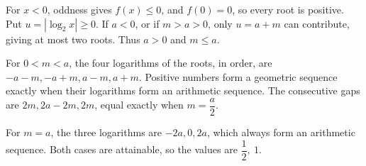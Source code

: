 For $x<0$, oddness gives $f(x)\le0$, and $f(0)=0$, so every root is positive. Put $u=|\log_2x|\ge0$. If $a<0$, or if $m>a>0$, only $u=a+m$ can contribute, giving at most two roots. Thus $a>0$ and $m\le a$.

For $0<m<a$, the four logarithms of the roots, in order, are $-a-m,-a+m,a-m,a+m$. Positive numbers form a geometric sequence exactly when their logarithms form an arithmetic sequence. The consecutive gaps are $2m,2a-2m,2m$, equal exactly when $m=\dfrac{a}{2}$.

For $m=a$, the three logarithms are $-2a,0,2a$, which always form an arithmetic sequence. Both cases are attainable, so the values are $\boxed{\dfrac{1}{2},\ 1}$.
